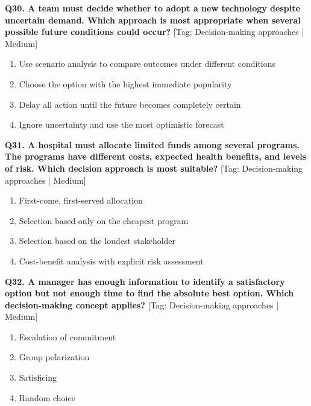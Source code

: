 \noindent\textbf{Q30. A team must decide whether to adopt a new technology despite uncertain demand. Which approach is most appropriate when several possible future conditions could occur?} \hfill [Tag: Decision-making approaches | Medium]
\begin{enumerate}[label=(\alph*),topsep=2pt,itemsep=1pt,partopsep=0pt,parsep=0pt]
    \item {Use scenario analysis to compare outcomes under different conditions}
    \item {Choose the option with the highest immediate popularity}
    \item {Delay all action until the future becomes completely certain}
    \item {Ignore uncertainty and use the most optimistic forecast}
\end{enumerate}
\vspace{2mm}

\noindent\textbf{Q31. A hospital must allocate limited funds among several programs. The programs have different costs, expected health benefits, and levels of risk. Which decision approach is most suitable?} \hfill [Tag: Decision-making approaches | Medium]
\begin{enumerate}[label=(\alph*),topsep=2pt,itemsep=1pt,partopsep=0pt,parsep=0pt]
    \item {First-come, first-served allocation}
    \item {Selection based only on the cheapest program}
    \item {Selection based on the loudest stakeholder}
    \item {Cost-benefit analysis with explicit risk assessment}
\end{enumerate}
\vspace{2mm}

\noindent\textbf{Q32. A manager has enough information to identify a satisfactory option but not enough time to find the absolute best option. Which decision-making concept applies?} \hfill [Tag: Decision-making approaches | Medium]
\begin{enumerate}[label=(\alph*),topsep=2pt,itemsep=1pt,partopsep=0pt,parsep=0pt]
    \item {Escalation of commitment}
    \item {Group polarization}
    \item {Satisficing}
    \item {Random choice}
\end{enumerate}
\vspace{2mm}

